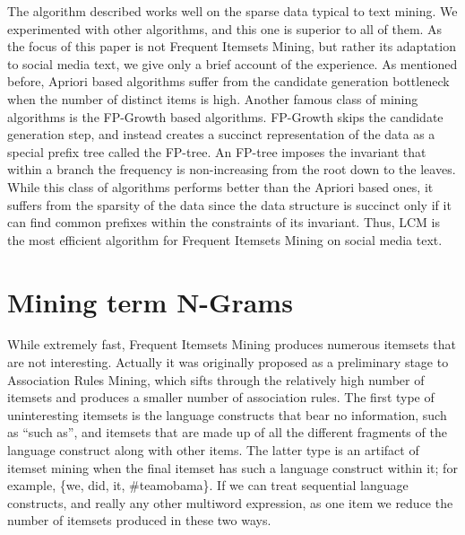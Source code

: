 \documentclass{sig-alternate}
\begin{document}
The algorithm described works well on the sparse data typical to text mining. We experimented with other algorithms, and this one is superior to all of them. As the focus of this paper is not Frequent Itemsets Mining, but rather its adaptation to social media text, we give only a brief account of the experience. As mentioned before, Apriori based algorithms suffer from the candidate generation bottleneck when the number of distinct items is high. Another famous class of mining algorithms is the FP-Growth \cite{han} based algorithms. FP-Growth  skips the candidate generation step, and instead creates a succinct representation of the data as a special prefix tree called the FP-tree. An FP-tree imposes the invariant that within a branch the frequency is non-increasing from the root down to the leaves. While this class of algorithms performs better than the Apriori based ones, it suffers from the sparsity of the data since the data structure is succinct only if it can find common prefixes within the constraints of its invariant. Thus, LCM is the most efficient algorithm for Frequent Itemsets Mining on social media text. 

\section{Mining term N-Grams}
While extremely fast, Frequent Itemsets Mining produces numerous itemsets that are not interesting. Actually it was originally proposed as a preliminary stage to Association Rules Mining, which sifts through the relatively high number of itemsets and produces a smaller number of association rules. The first type of uninteresting itemsets is the language constructs that bear no information, such as ``such as'', and itemsets that are made up of all the different fragments of the language construct along with other items. The latter type is an artifact of itemset mining when the final itemset has such a language construct within it; for example, \{we, did, it, \#teamobama\}.
If we can treat sequential language constructs, and really any other multiword expression, as one item we reduce the number of itemsets produced in these two ways. %
\end{document}
